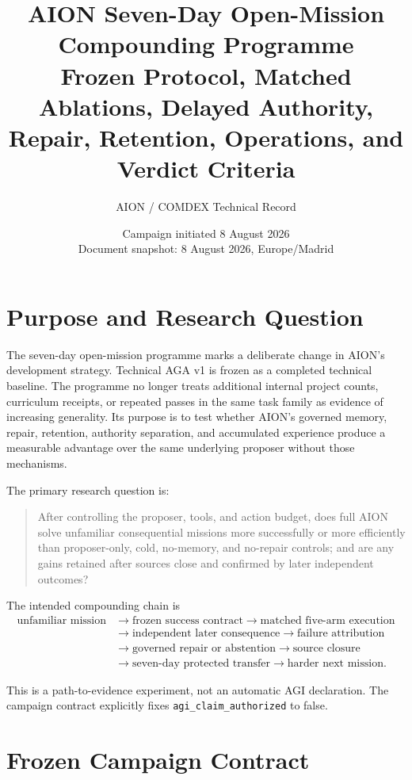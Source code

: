 \documentclass[11pt,a4paper]{article}
\title{\textbf{AION Seven-Day Open-Mission Compounding Programme}\\
\large Frozen Protocol, Matched Ablations, Delayed Authority, Repair, Retention,
Operations, and Verdict Criteria}
\author{AION / COMDEX Technical Record}
\date{Campaign initiated 8 August 2026\\Document snapshot: 8 August 2026, Europe/Madrid}
\begin{document}
\maketitle
\tableofcontents
\newpage

\section{Purpose and Research Question}
\label{sec:purpose}

The seven-day open-mission programme marks a deliberate change in AION's
development strategy.  Technical AGA v1 is frozen as a completed technical
baseline.  The programme no longer treats additional internal project counts,
curriculum receipts, or repeated passes in the same task family as evidence of
increasing generality.  Its purpose is to test whether AION's governed memory,
repair, retention, authority separation, and accumulated experience produce a
measurable advantage over the same underlying proposer without those
mechanisms.

The primary research question is:
\begin{quote}
After controlling the proposer, tools, and action budget, does full AION solve
unfamiliar consequential missions more successfully or more efficiently than
proposer-only, cold, no-memory, and no-repair controls; and are any gains
retained after sources close and confirmed by later independent outcomes?
\end{quote}

The intended compounding chain is
\begin{equation}
\begin{aligned}
\text{unfamiliar mission}
&\rightarrow \text{frozen success contract}
\rightarrow \text{matched five-arm execution} \\
&\rightarrow \text{independent later consequence}
\rightarrow \text{failure attribution} \\
&\rightarrow \text{governed repair or abstention}
\rightarrow \text{source closure} \\
&\rightarrow \text{seven-day protected transfer}
\rightarrow \text{harder next mission}.
\end{aligned}
\label{eq:compounding-chain}
\end{equation}

This is a path-to-evidence experiment, not an automatic AGI declaration.  The
campaign contract explicitly fixes \texttt{agi\_claim\_authorized} to false.

\section{Frozen Campaign Contract}
\label{sec:contract}
\end{document}
